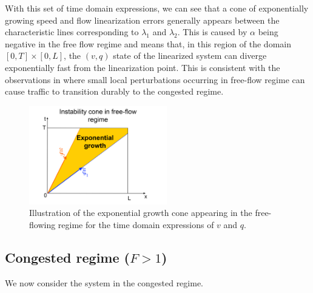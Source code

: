 \documentclass[a4paper, 10pt, conference]{ieeeconf}      %
\begin{document}
With this set of time domain expressions, we can see that a cone of exponentially growing speed and flow linearization errors generally appears between the characteristic lines corresponding to $\lambda_{1}$ and $\lambda_{2}$. This is caused by $\alpha$ being negative in the free flow regime and means that, in this region of the domain $\left[0,T\right] \times \left[0,L\right]$, the $\left(v,q\right)$ state of the linearized system can diverge exponentially fast from the linearization point. This is consistent with the observations in \cite{PhysRevLett.79.4030} where small local perturbations occurring in free-flow regime can cause traffic to transition durably to the congested regime.

\begin{figure}
\begin{centering}
\includegraphics[width=6cm]{Exp-growth}
\par\end{centering}
\protect\caption{Illustration of the exponential growth cone appearing in the free-flowing regime for the time domain expressions of $v$ and $q$.\label{Exp-growth}}
\end{figure}

\subsection{Congested regime ($F>1$)}
We now consider the system in the congested regime.
\end{document}
